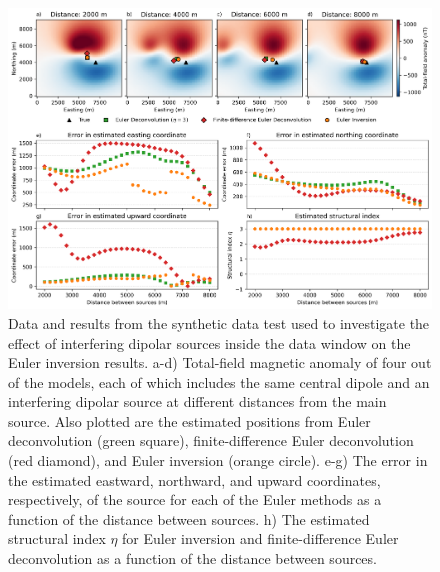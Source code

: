 \begin{figure}[tb!]
\centering
\includegraphics[width=1\linewidth]{euler-inversion/figures/synthetic-interfering-sources.png}
\caption{
    Data and results from the synthetic data test used to investigate the
    effect of interfering dipolar sources inside the data window on the Euler
    inversion results.
    a-d) Total-field magnetic anomaly of four out of the \SynInterfNModels{}
    models, each of which includes the same central dipole and an interfering
    dipolar source at different distances from the main source. Also plotted
    are the estimated positions from Euler deconvolution (green square),
    finite-difference Euler deconvolution (red diamond), and Euler inversion
    (orange circle).
    e-g) The error in the estimated eastward, northward, and upward
    coordinates, respectively, of the source for each of the Euler methods as
    a function of the distance between sources.
    h) The estimated structural index $\eta$ for Euler inversion and
    finite-difference Euler deconvolution as a function of the distance between
    sources.
}
\label{fig:interf}
\end{figure}

